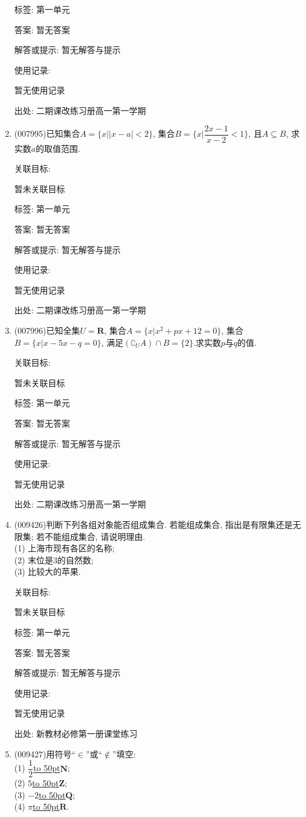 \documentclass[10pt,a4paper]{article}
\newcommand{\blank}[1]{\underline{\hbox to #1pt{}}}
\begin{document}
\begin{enumerate}[1.]
标签: 第一单元

答案: 暂无答案

解答或提示: 暂无解答与提示

使用记录:

暂无使用记录


出处: 二期课改练习册高一第一学期
\item { (007995)}已知集合$A=\{x||x-a|<2\}$, 集合$B=\{x|\dfrac{2x-1}{x-2}<1\}$, 且$A\subseteq B$, 求实数$a$的取值范围.


关联目标:

暂未关联目标



标签: 第一单元

答案: 暂无答案

解答或提示: 暂无解答与提示

使用记录:

暂无使用记录


出处: 二期课改练习册高一第一学期
\item { (007996)}已知全集$U=\mathbf{R}$, 集合$A=\{x|x^2+px+12=0\}$, 集合$B=\{x|x-5x-q=0\}$, 满足$(\complement _UA)\cap B=\{2\}$.求实数$p$与$q$的值.


关联目标:

暂未关联目标



标签: 第一单元

答案: 暂无答案

解答或提示: 暂无解答与提示

使用记录:

暂无使用记录


出处: 二期课改练习册高一第一学期
\item { (009426)}判断下列各组对象能否组成集合. 若能组成集合, 指出是有限集还是无限集; 若不能组成集合, 请说明理由.\\
(1) 上海市现有各区的名称;\\
(2) 末位是$3$的自然数;\\
(3) 比较大的苹果.


关联目标:

暂未关联目标



标签: 第一单元

答案: 暂无答案

解答或提示: 暂无解答与提示

使用记录:

暂无使用记录


出处: 新教材必修第一册课堂练习
\item { (009427)}用符号``$\in$''或``$\not\in$''填空:\\
(1) $\dfrac12$\blank{50}$\mathbf{N}$;\\
(2) $5$\blank{50}$\mathbf{Z}$;\\
(3) $-2$\blank{50}$\mathbf{Q}$;\\
(4) $\pi$\blank{50}$\mathbf{R}$.



\end{enumerate}
\end{document}
